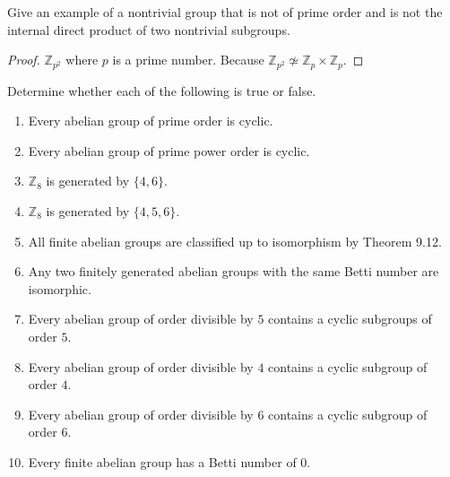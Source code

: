 \newpage
\begin{exercise}
    Give an example of a nontrivial group that is not of prime order and is not the internal direct product of two nontrivial subgroups.
\end{exercise}

\begin{proof}
    $\mathbb{Z}_{p^{2}}$ where $p$ is a prime number. Because $\mathbb{Z}_{p^{2}} \not\simeq \mathbb{Z}_{p} \times \mathbb{Z}_{p}$.
\end{proof}

\newpage
\begin{exercise}
    Determine whether each of the following is true or false.
    \begin{enumerate}[label={\textbf{\arabic*.}}]
        \item Every abelian group of prime order is cyclic.
        \item Every abelian group of prime power order is cyclic.
        \item $\mathbb{Z}_{8}$ is generated by $\{ 4, 6 \}$.
        \item $\mathbb{Z}_{8}$ is generated by $\{ 4, 5, 6 \}$.
        \item All finite abelian groups are classified up to isomorphism by Theorem 9.12.
        \item Any two finitely generated abelian groups with the same Betti number are isomorphic.
        \item Every abelian group of order divisible by $5$ contains a cyclic subgroups of order $5$.
        \item Every abelian group of order divisible by $4$ contains a cyclic subgroup of order $4$.
        \item Every abelian group of order divisible by $6$ contains a cyclic subgroup of order $6$.
        \item Every finite abelian group has a Betti number of $0$.
    \end{enumerate}
\end{exercise}


